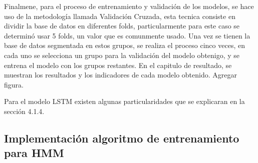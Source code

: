 Finalmene, para el proceso de entrenamiento y validación de los modelos, se hace uso de la metodología llamada Validación Cruzada, esta tecnica consiste en dividir la base de datos en diferentes folds, particularmente para este caso se determinó usar 5 folds, un valor que es comunmente usado. Una vez se tienen la base de datos segmentada en estos grupos, se realiza el proceso cinco veces, en cada uno se selecciona un grupo para la validación del modelo obtenigo, y se entrena el modelo con los grupos restantes. En el capitulo de resultado, se muestran los resultados y los indicadores de cada modelo obtenido. Agregar figura.

Para el modelo LSTM existen algunas particularidades que se explicaran en la sección 4.1.4.








\subsection{Implementación algoritmo de entrenamiento para HMM} %
\label{section4.1.1}

